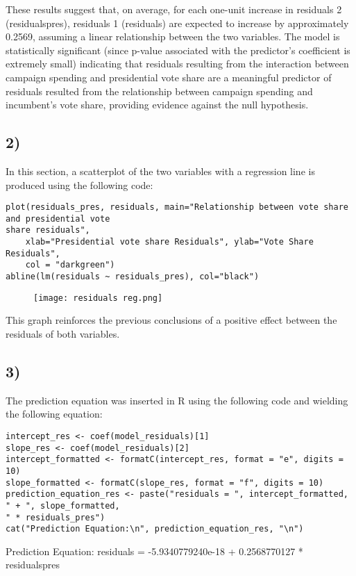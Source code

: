 \documentclass[oneside]{article}
\begin{document}
These results suggest that, on average, for each one-unit increase in residuals 2 (residualspres), residuals 1 (residuals) are expected to increase by approximately 0.2569, assuming a linear relationship between the two variables. The model is statistically significant (since p-value associated with the predictor's coefficient is extremely small) indicating that residuals resulting from the interaction between campaign spending and presidential vote share are a meaningful predictor of residuals resulted from the relationship between campaign spending and incumbent's vote share, providing evidence against the null hypothesis.

\subsection*{2)}

In this section, a scatterplot of the two variables with a regression line is produced using the following code:
\begin{verbatim}
plot(residuals_pres, residuals, main="Relationship between vote share and presidential vote
share residuals",
    xlab="Presidential vote share Residuals", ylab="Vote Share Residuals",
    col = "darkgreen")
abline(lm(residuals ~ residuals_pres), col="black")
\end{verbatim}

\begin{figure} [h]
    \centering
    \texttt{[image: residuals reg.png]}
    
    
\end{figure}
This graph reinforces the previous conclusions of a positive effect between the residuals of both variables.

\subsection*{3)}
The prediction equation was inserted in R using the following code and wielding the following equation:
\begin{verbatim}
intercept_res <- coef(model_residuals)[1]
slope_res <- coef(model_residuals)[2]
intercept_formatted <- formatC(intercept_res, format = "e", digits = 10)
slope_formatted <- formatC(slope_res, format = "f", digits = 10)
prediction_equation_res <- paste("residuals = ", intercept_formatted, " + ", slope_formatted,
" * residuals_pres")
cat("Prediction Equation:\n", prediction_equation_res, "\n")
\end{verbatim}
Prediction Equation:  residuals =  -5.9340779240e-18  +  0.2568770127  * residualspres 
\end{document}

